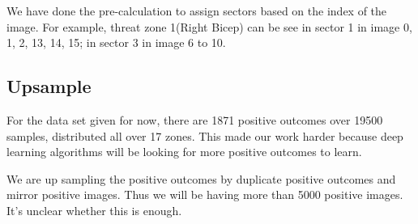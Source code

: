 \documentclass[conference,compsoc]{IEEEtran}
\begin{document}
We have done the pre-calculation to assign sectors based on the index of the image. For example, threat zone 1(Right Bicep) can be see in sector 1 in image 0, 1, 2, 13, 14, 15; in sector 3 in image 6 to 10.

\subsection{Upsample}
For the data set given for now, there are 1871 positive outcomes over 19500 samples, distributed all over 17 zones. This made our work harder because deep learning algorithms will be looking for more positive outcomes to learn. 

We are up sampling the positive outcomes by duplicate positive outcomes and mirror positive images. Thus we will be having more than 5000 positive images. It's unclear whether this is enough.
        


\end{document}
